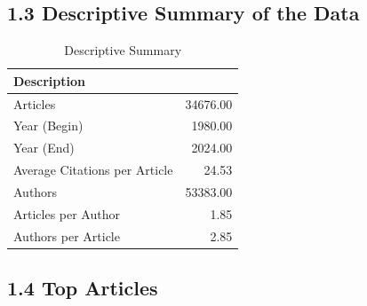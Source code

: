 \documentclass[
  12pt,
]{article}
\begin{document}
\subsection{1.3 Descriptive Summary of the
Data}\label{descriptive-summary-of-the-data}

\begin{table}[H]

\caption{\label{tab:descriptives}Descriptive Summary}
\centering
\begin{tabular}[t]{lr}
\toprule
Description & \\
\midrule
Articles & 34676.00\\
Year (Begin) & 1980.00\\
Year (End) & 2024.00\\
Average Citations per Article & 24.53\\
Authors & 53383.00\\
Articles per Author & 1.85\\
Authors per Article & 2.85\\
\bottomrule
\end{tabular}
\end{table}

\newpage

\subsection{1.4 Top Articles}\label{top-articles}
\end{document}
